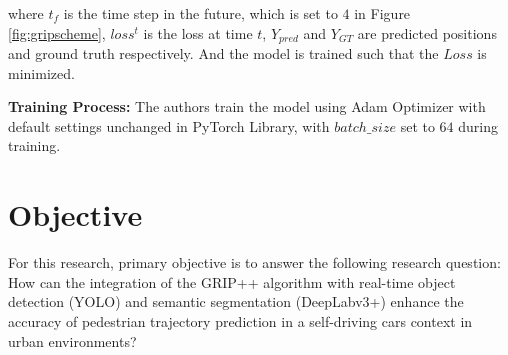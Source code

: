 where \(t_f\) is the time step in the future, which is set to \(4\) in Figure \ref{fig:gripscheme}, \(loss^t\) is the loss at time \(t\), \(Y_{pred}\) and \(Y_{GT}\) are predicted positions and ground truth respectively. And the model is trained such that the \(Loss\) is minimized. 

\tab \textbf{Training Process:} The authors train the model using Adam Optimizer with default settings unchanged in PyTorch Library, with \(batch\_size\) set to \(64\) during training.


\section{Objective}

\tab For this research, primary objective is to answer the following research question: How can the integration of the GRIP++ algorithm with real-time object detection (YOLO) and semantic segmentation (DeepLabv3+) enhance the accuracy of pedestrian trajectory prediction in a self-driving cars context in urban environments?